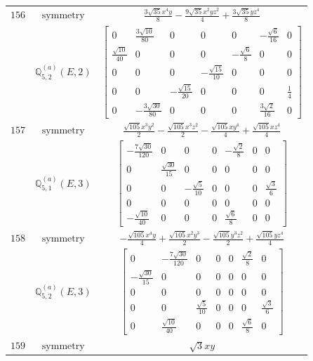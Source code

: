 \documentclass[fleqn,8pt,landscape]{jsarticle}
\begin{document}
\begin{longtable}{ccc}
$ 156 $ & $ \text{symmetry} $ & $ \frac{3 \sqrt{35} x^{4} y}{8} - \frac{9 \sqrt{35} x^{2} y z^{2}}{4} + \frac{3 \sqrt{35} y z^{4}}{8} $ \\
$  $ & $ \mathbb{Q}_{5,2}^{(a)}(E,2) $ & $ \begin{bmatrix} 0 & \frac{3 \sqrt{10}}{80} & 0 & 0 & 0 & - \frac{\sqrt{6}}{16} & 0 \\ \frac{\sqrt{10}}{40} & 0 & 0 & 0 & - \frac{\sqrt{6}}{8} & 0 & 0 \\ 0 & 0 & 0 & - \frac{\sqrt{15}}{10} & 0 & 0 & 0 \\ 0 & 0 & - \frac{\sqrt{15}}{20} & 0 & 0 & 0 & \frac{1}{4} \\ 0 & - \frac{3 \sqrt{30}}{80} & 0 & 0 & 0 & \frac{3 \sqrt{2}}{16} & 0 \end{bmatrix} $ \\ \hline
$ 157 $ & $ \text{symmetry} $ & $ \frac{\sqrt{105} x^{3} y^{2}}{2} - \frac{\sqrt{105} x^{3} z^{2}}{2} - \frac{\sqrt{105} x y^{4}}{4} + \frac{\sqrt{105} x z^{4}}{4} $ \\
$  $ & $ \mathbb{Q}_{5,1}^{(a)}(E,3) $ & $ \begin{bmatrix} - \frac{7 \sqrt{30}}{120} & 0 & 0 & 0 & - \frac{\sqrt{2}}{8} & 0 & 0 \\ 0 & \frac{\sqrt{30}}{15} & 0 & 0 & 0 & 0 & 0 \\ 0 & 0 & - \frac{\sqrt{5}}{10} & 0 & 0 & 0 & \frac{\sqrt{3}}{6} \\ 0 & 0 & 0 & 0 & 0 & 0 & 0 \\ - \frac{\sqrt{10}}{40} & 0 & 0 & 0 & \frac{\sqrt{6}}{8} & 0 & 0 \end{bmatrix} $ \\ \hline
$ 158 $ & $ \text{symmetry} $ & $ - \frac{\sqrt{105} x^{4} y}{4} + \frac{\sqrt{105} x^{2} y^{3}}{2} - \frac{\sqrt{105} y^{3} z^{2}}{2} + \frac{\sqrt{105} y z^{4}}{4} $ \\
$  $ & $ \mathbb{Q}_{5,2}^{(a)}(E,3) $ & $ \begin{bmatrix} 0 & - \frac{7 \sqrt{30}}{120} & 0 & 0 & 0 & \frac{\sqrt{2}}{8} & 0 \\ - \frac{\sqrt{30}}{15} & 0 & 0 & 0 & 0 & 0 & 0 \\ 0 & 0 & 0 & 0 & 0 & 0 & 0 \\ 0 & 0 & \frac{\sqrt{5}}{10} & 0 & 0 & 0 & \frac{\sqrt{3}}{6} \\ 0 & \frac{\sqrt{10}}{40} & 0 & 0 & 0 & \frac{\sqrt{6}}{8} & 0 \end{bmatrix} $ \\ \hline
$ 159 $ & $ \text{symmetry} $ & $ \sqrt{3} x y $ \\

\end{longtable}
\end{document}
